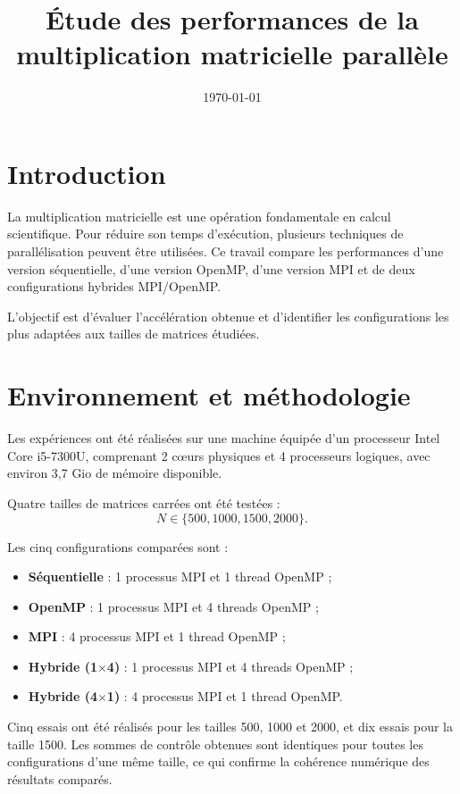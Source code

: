 \documentclass[11pt,a4paper]{article}
\title{\textbf{Étude des performances de la multiplication matricielle parallèle}}
\author{}
\date{\today}
\begin{document}
	
	\maketitle
	
	\section{Introduction}
	
	La multiplication matricielle est une opération fondamentale en calcul
	scientifique. Pour réduire son temps d'exécution, plusieurs techniques de
	parallélisation peuvent être utilisées. Ce travail compare les performances
	d'une version séquentielle, d'une version OpenMP, d'une version MPI et de
	deux configurations hybrides MPI/OpenMP.
	
	L'objectif est d'évaluer l'accélération obtenue et d'identifier les
	configurations les plus adaptées aux tailles de matrices étudiées.
	
	\section{Environnement et méthodologie}
	
	Les expériences ont été réalisées sur une machine équipée d'un processeur
	Intel Core i5-7300U, comprenant 2 cœurs physiques et 4 processeurs logiques,
	avec environ 3,7 Gio de mémoire disponible.
	
	Quatre tailles de matrices carrées ont été testées :
	\[
	N \in \{500,1000,1500,2000\}.
	\]
	
	Les cinq configurations comparées sont :
	
	\begin{itemize}
		\item \textbf{Séquentielle} : 1 processus MPI et 1 thread OpenMP ;
		\item \textbf{OpenMP} : 1 processus MPI et 4 threads OpenMP ;
		\item \textbf{MPI} : 4 processus MPI et 1 thread OpenMP ;
		\item \textbf{Hybride (1$\times$4)} : 1 processus MPI et 4 threads OpenMP ;
		\item \textbf{Hybride (4$\times$1)} : 4 processus MPI et 1 thread OpenMP.
	\end{itemize}
	
	Cinq essais ont été réalisés pour les tailles 500, 1000 et 2000, et dix
	essais pour la taille 1500. Les sommes de contrôle obtenues sont identiques
	pour toutes les configurations d'une même taille, ce qui confirme la
	cohérence numérique des résultats comparés.
	
\end{document}
